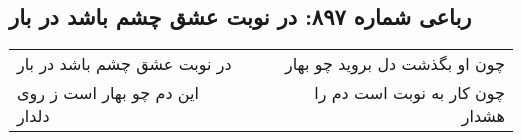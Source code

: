 \begin{center}
\section*{رباعی شماره ۸۹۷: در نوبت عشق چشم باشد در بار}
\label{sec:0897}
\begin{longtable}{l p{0.5cm} r}
در نوبت عشق چشم باشد در بار
&&
چون او بگذشت دل بروید چو بهار
\\
این دم چو بهار است ز روی دلدار
&&
چون کار به نوبت است دم را هشدار
\\
\end{longtable}
\end{center}
